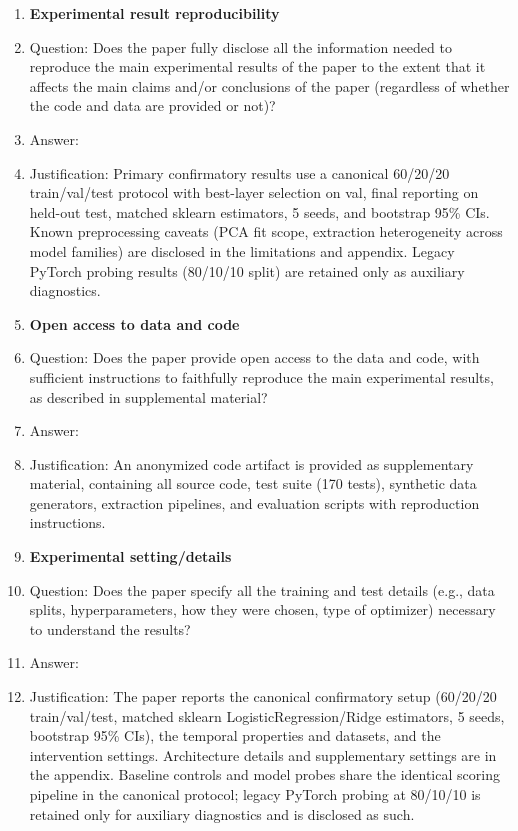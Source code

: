 \begin{enumerate}
\item {\bf Experimental result reproducibility}
    \item[] Question: Does the paper fully disclose all the information needed to reproduce the main experimental results of the paper to the extent that it affects the main claims and/or conclusions of the paper (regardless of whether the code and data are provided or not)?
    \item[] Answer: \answerYes{}
    \item[] Justification: Primary confirmatory results use a canonical 60/20/20 train/val/test protocol with best-layer selection on val, final reporting on held-out test, matched sklearn estimators, 5 seeds, and bootstrap 95\% CIs. Known preprocessing caveats (PCA fit scope, extraction heterogeneity across model families) are disclosed in the limitations and appendix. Legacy PyTorch probing results (80/10/10 split) are retained only as auxiliary diagnostics.

\item {\bf Open access to data and code}
    \item[] Question: Does the paper provide open access to the data and code, with sufficient instructions to faithfully reproduce the main experimental results, as described in supplemental material?
    \item[] Answer: \answerYes{}
    \item[] Justification: An anonymized code artifact is provided as supplementary material, containing all source code, test suite (170 tests), synthetic data generators, extraction pipelines, and evaluation scripts with reproduction instructions.

\item {\bf Experimental setting/details}
    \item[] Question: Does the paper specify all the training and test details (e.g., data splits, hyperparameters, how they were chosen, type of optimizer) necessary to understand the results?
    \item[] Answer: \answerYes{}
    \item[] Justification: The paper reports the canonical confirmatory setup (60/20/20 train/val/test, matched sklearn LogisticRegression/Ridge estimators, 5 seeds, bootstrap 95\% CIs), the temporal properties and datasets, and the intervention settings. Architecture details and supplementary settings are in the appendix. Baseline controls and model probes share the identical scoring pipeline in the canonical protocol; legacy PyTorch probing at 80/10/10 is retained only for auxiliary diagnostics and is disclosed as such.


\end{enumerate}
